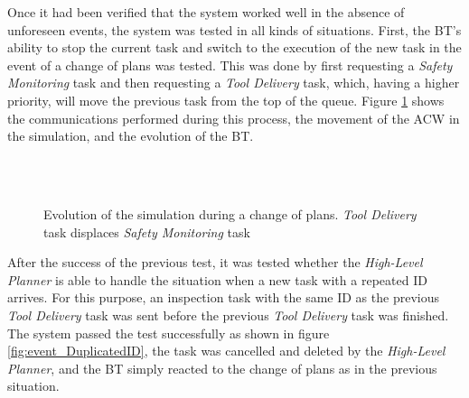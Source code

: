 Once it had been verified that the system worked well in the absence of unforeseen events, the system was tested in all kinds of situations. First, the \gls{BT}'s ability to stop the current task and switch to the execution of the new task in the event of a change of plans was tested. This was done by first requesting a \emph{Safety Monitoring} task and then requesting a \emph{Tool Delivery} task, which, having a higher priority, will move the previous task from the top of the queue. Figure \ref{fig:event_ChangeOfPlans} shows the communications performed during this process, the movement of the \gls{ACW} in the simulation, and the evolution of the \gls{BT}.

\begin{figure}[htbp]
    \centering
    \hfill
    \\
    \hfill
    \\
        \hfill
    \caption{Evolution of the simulation during a change of plans. \emph{Tool Delivery} task displaces \emph{Safety Monitoring} task}
    \label{fig:event_ChangeOfPlans}
\end{figure}

After the success of the previous test, it was tested whether the \emph{High-Level Planner} is able to handle the situation when a new task with a repeated \gls{ID} arrives. For this purpose, an inspection task with the same \gls{ID} as the previous \emph{Tool Delivery} task was sent before the previous \emph{Tool Delivery} task was finished. The system passed the test successfully as shown in figure \ref{fig:event_DuplicatedID}, the task was cancelled and deleted by the \emph{High-Level Planner}, and the \gls{BT} simply reacted to the change of plans as in the previous situation.

